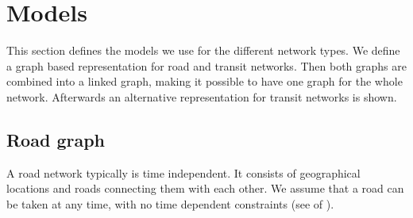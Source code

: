\section{Models}\label{models}
	This section defines the models we use for the different network types. We define a graph
	based representation for road and transit networks. Then both graphs are combined
	into a linked graph, making it possible to have one graph for the whole network.
	Afterwards an alternative representation for transit networks is shown.
	
\subsection{Road graph}
	A road network typically is time independent. It consists of geographical locations and roads connecting them with each other.
	We assume that a road can be taken at any time, with no time dependent constraints (see  of ).
	
